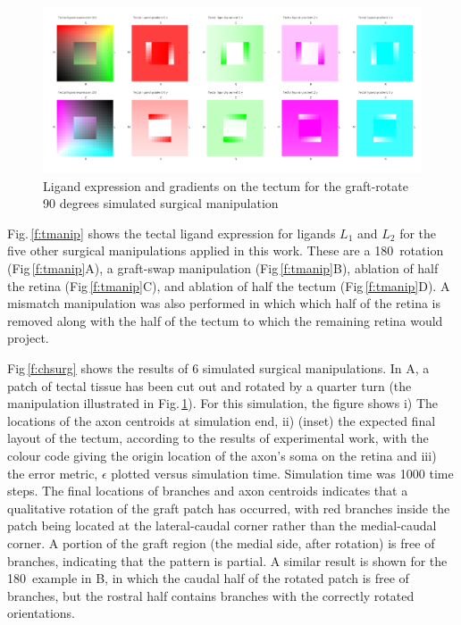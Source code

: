 \documentclass[11pt, a4paper]{article}
\begin{document}
%
\begin{figure}
\includegraphics[width=\linewidth]{./images/Tissuevisb.png}
\caption{Ligand expression and gradients on the tectum for the
graft-rotate 90 degrees simulated surgical manipulation}
\label{f:trot90}
\end{figure}

Fig.\,\ref{f:tmanip} shows the tectal ligand expression for ligands $L_1$ and
$L_2$ for the five other surgical manipulations applied in this work. These
are a 180\degree~rotation (Fig\,\ref{f:tmanip}A), a graft-swap manipulation
(Fig\,\ref{f:tmanip}B), ablation of half the retina (Fig\,\ref{f:tmanip}C),
and ablation of half the tectum (Fig\,\ref{f:tmanip}D). A mismatch
manipulation was also performed in which which half of the retina is removed
along with the half of the tectum to which the remaining retina would project.

Fig\,\ref{f:chsurg} shows the results of 6 simulated surgical
manipulations. In A, a patch of tectal tissue has been cut out and rotated by
a quarter turn (the manipulation illustrated in Fig.\,\ref{f:trot90}). For
this simulation, the figure shows i) The locations of the axon centroids at
simulation end, ii) (inset) the expected final layout of the tectum, according
to the results of experimental work, with the colour code giving the origin
location of the axon's soma on the retina and iii) the error metric,
$\epsilon$ plotted versus simulation time. Simulation time was 1000 time
steps. The final locations of branches and axon centroids indicates that a
qualitative rotation of the graft patch has occurred, with red branches inside
the patch being located at the lateral-caudal corner rather than the
medial-caudal corner. A portion of the graft region (the medial side, after
rotation) is free of branches, indicating that the pattern is partial. A
similar result is shown for the 180\degree~example in B, in which the caudal
half of the rotated patch is free of branches, but the rostral half contains
branches with the correctly rotated orientations.
\end{document}
